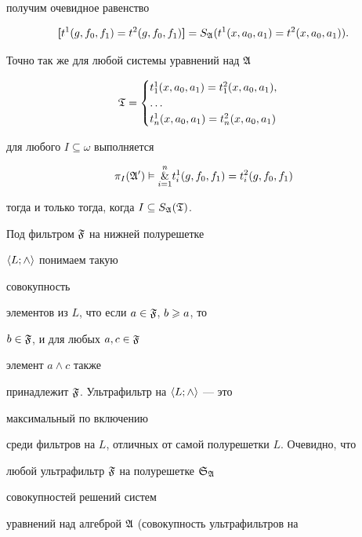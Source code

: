 \begin{pf}
получим очевидное равенство


$$


\bsl t^1(g,f_0,f_1)=t^2(g,f_0,f_1)\bsr =


S_{\frak A}(t^1(x,a_0,a_1)=t^2(x,a_0,a_1)).


$$


Точно так же для любой системы уравнений над $\frak A$


$$


\frak T=


\begin{cases}


t^1_1(x,a_0,a_1)=t^2_1(x,a_0,a_1),\\


\dots \\


t^1_n(x,a_0,a_1)=t^2_n(x,a_0,a_1)


\end{cases}


$$


для любого $I\subseteq\omega$ выполняется


$$


\pi_I(\frak A')\vDash\overset{n}{\underset{i=1}{\&}}{}


t^1_i(g,f_0,f_1)=t^2_i(g,f_0,f_1)


$$


тогда и только тогда, когда $I\subseteq S_{\frak A}(\frak T)$.





Под фильтром $\frak F$ на нижней полурешетке


$\langle L;\wedge\rangle$ понимаем такую


совокупность


элементов из $L$, что если $a\in\frak F$, $b\geqslant a$, то


$b\in\frak F$, и для любых $a,c\in\frak F$


элемент $a\wedge c$ также


принадлежит $\frak F$. Ультрафильтр на $\langle L;\wedge\rangle$ --- это


максимальный по включению


среди фильтров на $L$, отличных от самой полурешетки $L$. Очевидно, что


любой ультрафильтр $\frak F$ на полурешетке $\frak S_{\frak A}$


совокупностей решений систем


уравнений над алгеброй $\frak A$ (совокупность ультрафильтров на



\end{pf}
